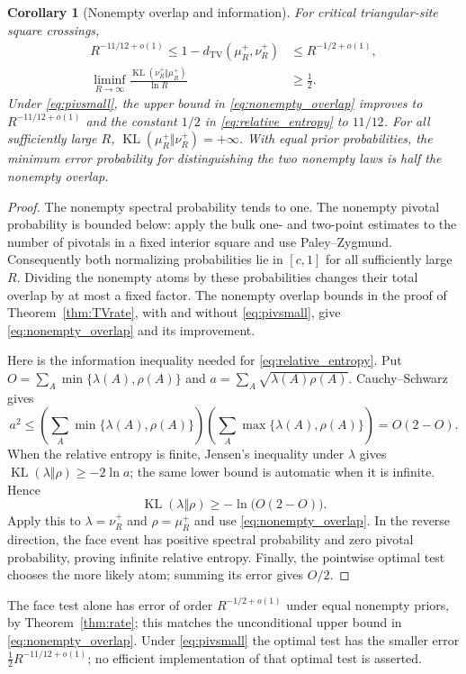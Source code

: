 \documentclass[11pt]{amsart}
\newtheorem{corollary}[theorem]{Corollary}
\theoremstyle{remark}
\newcommand{\TV}{d_{\mathrm{TV}}}
\begin{document}
\begin{corollary}[Nonempty overlap and information]\label{cor:testing}
For critical triangular-site square crossings,
\begin{align}
 R^{-11/12+o(1)}\le 1-\TV(\mu_R^+,\nu_R^+)&\le R^{-1/2+o(1)},\label{eq:nonempty_overlap}\\
 \liminf_{R\to\infty}\frac{\operatorname{KL}(\nu_R^+\Vert\mu_R^+)}{\ln R}
 &\ge\frac12.\label{eq:relative_entropy}
\end{align}
Under \eqref{eq:pivsmall}, the upper bound in \eqref{eq:nonempty_overlap} improves to $R^{-11/12+o(1)}$ and the constant $1/2$ in \eqref{eq:relative_entropy} to $11/12$. For all sufficiently large $R$, $\operatorname{KL}(\mu_R^+\Vert\nu_R^+)=+\infty$. With equal prior probabilities, the minimum error probability for distinguishing the two nonempty laws is half the nonempty overlap.
\end{corollary}
\begin{proof}
The nonempty spectral probability tends to one. The nonempty pivotal probability is bounded below: apply the bulk one- and two-point estimates to the number of pivotals in a fixed interior square and use Paley--Zygmund. Consequently both normalizing probabilities lie in $[c,1]$ for all sufficiently large $R$. Dividing the nonempty atoms by these probabilities changes their total overlap by at most a fixed factor. The nonempty overlap bounds in the proof of Theorem~\ref{thm:TVrate}, with and without \eqref{eq:pivsmall}, give \eqref{eq:nonempty_overlap} and its improvement.

Here is the information inequality needed for \eqref{eq:relative_entropy}. Put $O=\sum_A\min\{\lambda(A),\rho(A)\}$ and $a=\sum_A\sqrt{\lambda(A)\rho(A)}$. Cauchy--Schwarz gives
\[
 a^2\le\left(\sum_A\min\{\lambda(A),\rho(A)\}\right)
 \left(\sum_A\max\{\lambda(A),\rho(A)\}\right)=O(2-O).
\]
When the relative entropy is finite, Jensen's inequality under $\lambda$ gives $\operatorname{KL}(\lambda\Vert\rho)\ge-2\ln a$; the same lower bound is automatic when it is infinite. Hence
\[
 \operatorname{KL}(\lambda\Vert\rho)\ge-\ln\bigl(O(2-O)\bigr).
\]
Apply this to $\lambda=\nu_R^+$ and $\rho=\mu_R^+$ and use \eqref{eq:nonempty_overlap}. In the reverse direction, the face event has positive spectral probability and zero pivotal probability, proving infinite relative entropy. Finally, the pointwise optimal test chooses the more likely atom; summing its error gives $O/2$.
\end{proof}

The face test alone has error of order $R^{-1/2+o(1)}$ under equal nonempty priors, by Theorem~\ref{thm:rate}; this matches the unconditional upper bound in \eqref{eq:nonempty_overlap}. Under \eqref{eq:pivsmall} the optimal test has the smaller error $\frac12R^{-11/12+o(1)}$; no efficient implementation of that optimal test is asserted.
\end{document}
